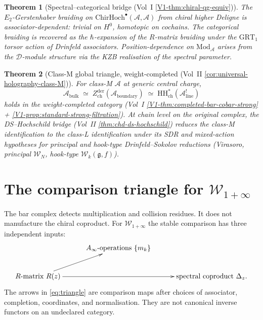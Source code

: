\documentclass[11pt]{article}
\newtheorem{theorem}{Theorem}[section]
\theoremstyle{remark}
\providecommand{\cA}{\mathcal{A}}
\providecommand{\cD}{\mathcal{D}}
\providecommand{\cW}{\mathcal{W}}
\providecommand{\Mod}{\mathrm{Mod}}
\providecommand{\ChirHoch}{\mathrm{ChirHoch}}
\providecommand{\fg}{\mathfrak{g}}
\providecommand{\Ainf}{A_\infty}
\begin{document}
\begin{theorem}[Spectral--categorical bridge (Vol~I
\ref*{V1-thm:chiral-qg-equiv})]%
\label{thm:spectral-categorical-standalone}%
The $E_2$-Gerstenhaber braiding on
$\ChirHoch^\bullet(\cA, \cA)$ from chiral higher Deligne is
associator-dependent: trivial on $H^0$, homotopic on cochains. The
categorical braiding is recovered as the $\hbar$-expansion of the
$R$-matrix braiding under the $\mathrm{GRT}_1$ torsor action of
Drinfeld associators. Position-dependence on
$\Mod_\cA$ arises from the $\cD$-module structure via the
KZB realisation of the spectral parameter.
\end{theorem}

\begin{theorem}[Class-M global triangle, weight-completed (Vol~II
\ref*{cor:universal-holography-class-M})]%
\label{thm:class-M-global-triangle-standalone}%
For class-M $\cA$ at generic central charge,
\[
  \cA_{\mathrm{bulk}}
  \;\simeq\;
  Z^{\mathrm{der}}_{\mathrm{ch}}(\cA_{\mathrm{boundary}})
  \;\simeq\;
  \mathrm{HH}^*_{\mathrm{ch}}(\cA^{!}_{\mathrm{line}})
\]
holds in the weight-completed category (Vol~I
\ref*{V1-thm:completed-bar-cobar-strong} +
\ref*{V1-prop:standard-strong-filtration}). At chain level on the
original complex, the DS--Hochschild bridge (Vol~II
\ref*{thm:chd-ds-hochschild}) reduces the class-M identification
to the class-L identification under its SDR and mixed-action
hypotheses for principal and hook-type
Drinfeld--Sokolov reductions (Virasoro, principal $\cW_N$, hook-type
$\cW_k(\fg, f)$).
\end{theorem}


\section{The comparison triangle for $\mathcal{W}_{1+\infty}$}
\label{sec:equiv-triangle}

The bar complex detects multiplication and collision residues.  It does
not manufacture the chiral coproduct.  For
$\mathcal{W}_{1+\infty}$ the stable comparison has three independent
inputs:
\begin{equation}\label{eq:triangle}
\xymatrix@C=3em{
& \Ainf\text{-operations } \{m_k\} \\
R\text{-matrix } R(z) \ar[ur] \ar[rr]
&& \text{spectral coproduct } \Delta_z .
}
\end{equation}
The arrows in \eqref{eq:triangle} are comparison maps after choices of
associator, completion, coordinates, and normalisation.  They are not
canonical inverse functors on an undeclared category.
\end{document}
